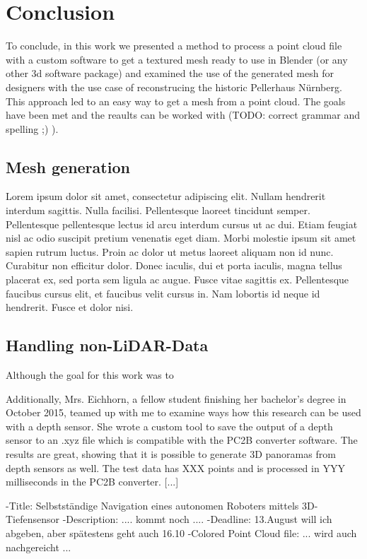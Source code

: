 \section{Conclusion}

To conclude, in this work we presented a method to process a point cloud file with a custom software to get a textured mesh ready to use in Blender (or any other 3d software package) and examined the use of the generated mesh for designers with the use case of reconstrucing the historic Pellerhaus Nürnberg.
This approach led to an easy way to get a mesh from a point cloud. The goals have been met and the reaults can be worked with (TODO: correct grammar and spelling ;) ).

\subsection{Mesh generation}

Lorem ipsum dolor sit amet, consectetur adipiscing elit. Nullam hendrerit interdum sagittis. Nulla facilisi. Pellentesque laoreet tincidunt semper. Pellentesque pellentesque lectus id arcu interdum cursus ut ac dui. Etiam feugiat nisl ac odio suscipit pretium venenatis eget diam. Morbi molestie ipsum sit amet sapien rutrum luctus. Proin ac dolor ut metus laoreet aliquam non id nunc. Curabitur non efficitur dolor. Donec iaculis, dui et porta iaculis, magna tellus placerat ex, sed porta sem ligula ac augue. Fusce vitae sagittis ex. Pellentesque faucibus cursus elit, et faucibus velit cursus in. Nam lobortis id neque id hendrerit. Fusce et dolor nisi.

\subsection{Handling non-LiDAR-Data}

Although the goal for this work was to 

Additionally, Mrs. Eichhorn, a fellow student finishing her bachelor's degree in October 2015, teamed up with me to examine ways how this research can be used with a depth sensor. She wrote a custom tool to save the output of a depth sensor to an .xyz file which is compatible with the PC2B converter software. The results are great, showing that it is possible to generate 3D panoramas from depth sensors as well. The test data has XXX points and is processed in YYY milliseconds in the PC2B converter. [...]


-Title: Selbstständige Navigation eines autonomen Roboters mittels 3D-Tiefensensor
-Description: .... kommt noch ....
-Deadline:  13.August will ich abgeben, aber spätestens geht auch 16.10
-Colored Point Cloud file: ... wird auch nachgereicht ...




